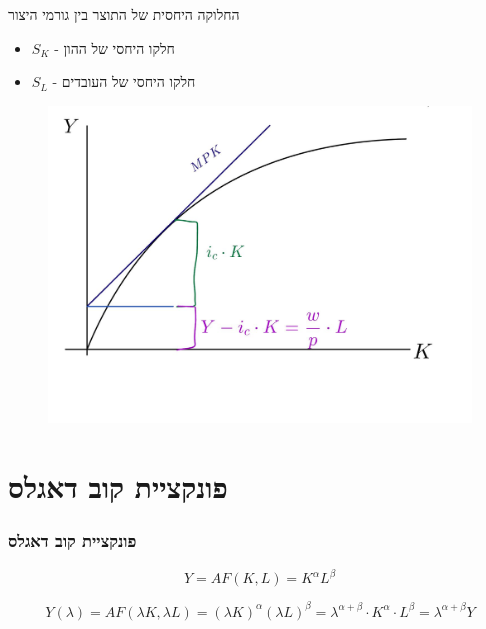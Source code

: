 \documentclass[usenames,dvipsnames,10pt]{beamer}
\renewcommand{\a}{\alpha}
\begin{document}
\begin{RTL}
\begin{frame}[allowframebreaks]
\begin{block}{החלוקה היחסית של התוצר בין גורמי היצור}
            \begin{itemize}
                \item $S_K$ - חלקו היחסי של ההון
                \item $S_L$ - חלקו היחסי של העובדים
            \end{itemize}
        \end{block}


        \framebreak
        \begin{figure}
            \begin{small}
                \begin{center}
                    \includegraphics[width=1.1\textwidth]{WhatsApp Image 2024-02-10 at 23.50.58.jpeg}
                \end{center}
                \caption{}
                \label{fig:}
            \end{small}
        \end{figure}
        
    \end{frame}

    \section{פונקציית קוב דאגלס}
    \begin{frame}[allowframebreaks]
        \frametitle{פונקציית קוב דאגלס}
        \begin{equation*}
            Y = AF(K,L) = K^{\a} L^{\beta}
        \end{equation*}

        \begin{equation*}
            Y(\lambda) = AF(\lambda K, \lambda L) = (\lambda K ) ^ \alpha (\lambda L) ^ \beta = \lambda ^ {\alpha + \beta} \cdot K ^ \alpha \cdot L ^ \beta = \lambda ^{\alpha + \beta} Y
        \end{equation*}
        

\end{frame}
\end{RTL}
\end{document}
